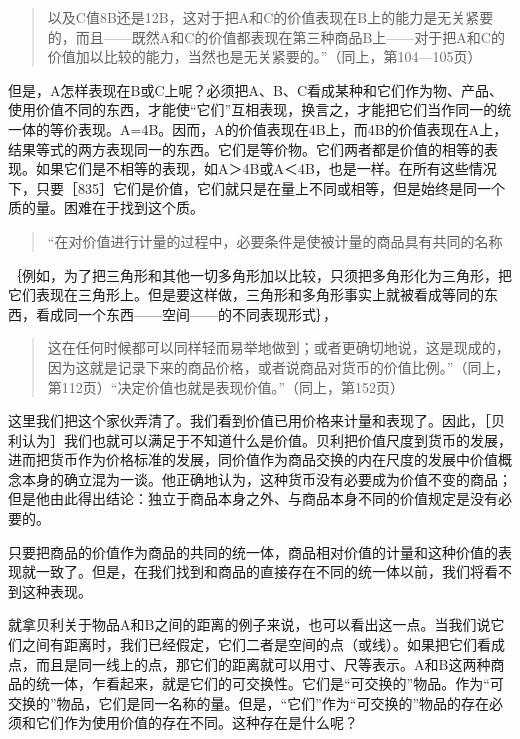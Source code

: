 \begin{quote}{以及C值8B还是12B，这对于把A和C的价值表现在B上的能力是无关紧要的，而且——既然A和C的价值都表现在第三种商品B上——对于把A和C的价值加以比较的能力，当然也是无关紧要的。”（同上，第104—105页）}\end{quote}

但是，A怎样表现在B或C上呢？必须把A、B、C看成某种和它们作为物、产品、使用价值不同的东西，才能使“它们”互相表现，换言之，才能把它们当作同一的统一体的等价表现。A=4B。因而，A的价值表现在4B上，而4B的价值表现在A上，结果等式的两方表现同一的东西。它们是等价物。它们两者都是价值的相等的表现。如果它们是不相等的表现，如A＞4B或A＜4B，也是一样。在所有这些情况下，只要［835］它们是价值，它们就只是在量上不同或相等，但是始终是同一个质的量。困难在于找到这个质。

\begin{quote}{“在对价值进行计量的过程中，必要条件是使被计量的商品具有共同的名称}\end{quote}

｛例如，为了把三角形和其他一切多角形加以比较，只须把多角形化为三角形，把它们表现在三角形上。但是要这样做，三角形和多角形事实上就被看成等同的东西，看成同一个东西——空间——的不同表现形式｝，

\begin{quote}{这在任何时候都可以同样轻而易举地做到；或者更确切地说，这是现成的，因为这就是记录下来的商品价格，或者说商品对货币的价值比例。”（同上，第112页）“决定价值也就是表现价值。”（同上，第152页）}\end{quote}

这里我们把这个家伙弄清了。我们看到价值已用价格来计量和表现了。因此，［贝利认为］我们也就可以满足于不知道什么是价值。贝利把价值尺度到货币的发展，进而把货币作为价格标准的发展，同价值作为商品交换的内在尺度的发展中价值概念本身的确立混为一谈。他正确地认为，这种货币没有必要成为价值不变的商品；但是他由此得出结论：独立于商品本身之外、与商品本身不同的价值规定是没有必要的。

只要把商品的价值作为商品的共同的统一体，商品相对价值的计量和这种价值的表现就一致了。但是，在我们找到和商品的直接存在不同的统一体以前，我们将看不到这种表现。

就拿贝利关于物品A和B之间的距离的例子来说，也可以看出这一点。当我们说它们之间有距离时，我们已经假定，它们二者是空间的点（或线）。如果把它们看成点，而且是同一线上的点，那它们的距离就可以用寸、尺等表示。A和B这两种商品的统一体，乍看起来，就是它们的可交换性。它们是“可交换的”物品。作为“可交换的”物品，它们是同一名称的量。但是，“它们”作为“可交换的”物品的存在必须和它们作为使用价值的存在不同。这种存在是什么呢？

